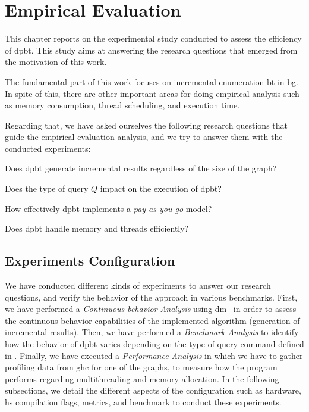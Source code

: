 \chapter{Empirical Evaluation}\label{experiments}
This chapter reports on the experimental study conducted to assess the efficiency of \acrshort{dpbt}. This study aims at answering the research questions that emerged from the motivation of this work. 

The fundamental part of this work focuses on incremental enumeration \acrshort{bt} in \acrshort{bg}. 
In spite of this, there are other important areas for doing empirical analysis such as memory consumption, thread scheduling, and execution time.

Regarding that, we have asked ourselves the following research questions that guide the empirical evaluation analysis, and we try to answer them with the conducted experiments:
\begin{inparaenum}[\bf {\bf RQ}1\upshape)]
\label{res:bt:question}
    \item Does \acrshort{dpbt} generate incremental results regardless of the size of the graph?
    \item Does the type of query $Q$ impact on the execution of \acrshort{dpbt}?
    \item How effectively \acrshort{dpbt} implements a \emph{pay-as-you-go} model?
    \item Does \acrshort{dpbt} handle memory and threads efficiently?
\end{inparaenum}
  
\section{Experiments Configuration}
We have conducted different kinds of experiments to answer our research questions, and verify the behavior of the approach in various benchmarks.
First, we have performed a \emph{Continuous behavior Analysis} using \acrfull{dm}~\cite{diefpaper} in order to assess the continuous behavior capabilities of the implemented algorithm (generation of incremental results). 
Then, we have performed a \emph{Benchmark Analysis} to identify how the behavior of \acrshort{dpbt} varies depending on the type of query command defined in .
Finally, we have executed a \textit{Performance Analysis} in which we have to gather profiling data from \acrfull{ghc} for one of the graphs, 
to measure how the program performs regarding multithreading and memory allocation.
In the following subsections, we detail the different aspects of the configuration such as hardware, \acrshort{hs} compilation flags, metrics, and benchmark to conduct these experiments.


